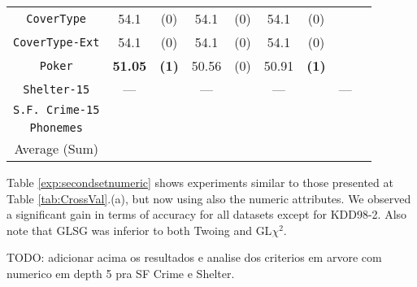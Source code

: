 \begin{table*}
\begin{tabular}{c|cc|cc|cc|cc}
{\tt CoverType}    &54.1        & (0)       & 54.1        & (0)       & 54.1        & (0)       &             &           \\
{\tt CoverType-Ext}&54.1        & (0)       & 54.1        & (0)       & 54.1        & (0)       &             &           \\
{\tt Poker}        &{\bf 51.05} & {\bf (1)} & 50.56       & (0)       & 50.91       & {\bf (1)} &             &           \\  
{\tt Shelter-15}   & ---        &           & ---         &           &  ---        &           & ---         &           \\   
{\tt S.F. Crime-15}&            &           &             &           &             &           &             &           \\ 
{\tt Phonemes}     &            &           &             &           &             &           &             &           \\ 
\hline
Average (Sum)      &            &           &             &           &             &           &             & 
       \end{tabular}
\end{table*}


Table \ref{exp:secondsetnumeric} shows experiments  similar to those presented at Table \ref{tab:CrossVal}.(a), but now
using also the numeric attributes. We observed a significant gain in terms of accuracy for all datasets except for KDD98-2. 
Also note that GLSG was inferior to both Twoing and GL$\chi^2$.

TODO: adicionar acima os resultados e analise dos criterios em arvore com numerico em depth 5 pra SF Crime e Shelter.

